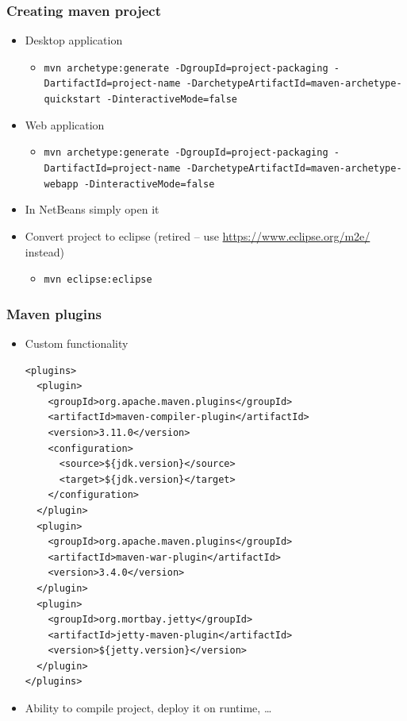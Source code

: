 \documentclass[10pt,xcolor=pdflatex]{beamer}
\begin{document}
\begin{frame}[containsverbatim]\frametitle{Creating maven project}
\begin{itemize}
	\item Desktop application
	  \begin{itemize}
		\item \texttt{mvn archetype:generate -DgroupId={project-packaging} -DartifactId={project-name} -DarchetypeArtifactId=maven-archetype-quickstart -DinteractiveMode=false}
	  \end{itemize}
    \item Web application
      \begin{itemize}
    	\item \texttt{mvn archetype:generate -DgroupId={project-packaging} -DartifactId={project-name} -DarchetypeArtifactId=maven-archetype-webapp -DinteractiveMode=false}
      \end{itemize}
    \item In NetBeans simply open it
    \item Convert project to eclipse (retired -- use \url{https://www.eclipse.org/m2e/} instead)
      \begin{itemize}
    	\item \texttt{mvn eclipse:eclipse}
      \end{itemize}
\end{itemize}
\end{frame}


\begin{frame}[containsverbatim]\frametitle{Maven plugins}
\begin{itemize}
  \item Custom functionality
	\begin{footnotesize}
	\begin{verbatim}
<plugins>
  <plugin>
    <groupId>org.apache.maven.plugins</groupId>
    <artifactId>maven-compiler-plugin</artifactId>
    <version>3.11.0</version>
    <configuration>
      <source>${jdk.version}</source>
      <target>${jdk.version}</target>
    </configuration>
  </plugin>
  <plugin>
    <groupId>org.apache.maven.plugins</groupId>
    <artifactId>maven-war-plugin</artifactId>
    <version>3.4.0</version>
  </plugin>
  <plugin>
    <groupId>org.mortbay.jetty</groupId>
    <artifactId>jetty-maven-plugin</artifactId>
    <version>${jetty.version}</version>
  </plugin>
</plugins>
	\end{verbatim}
	\end{footnotesize}
  \item Ability to compile project, deploy it on runtime, \ldots
\end{itemize}
\end{frame}
\end{document}
